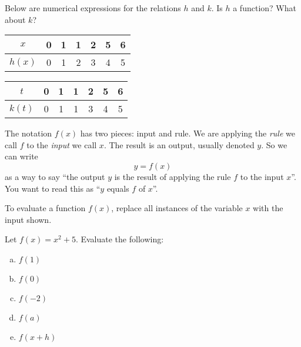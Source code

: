\documentclass[notes]{subfiles}
\begin{document}
		\begin{ex} 
			Below are numerical expressions for the relations $h$ and $k$.  Is $h$ a function?  What about $k$?
			\begin{center}
				{\renewcommand{\arraystretch}{1.2}
				\begin{tabular}{|c|c|c|c|c|c|c|} \hline
					$x$ & 0 & 1 & 1 & 2 & 5 & 6 \\ \hline
					$h(x)$ & 0& 1 & 2 & 3 & 4 & 5 \\ \hline
				\end{tabular}\hspace*{15pt}
				\begin{tabular}{|c|c|c|c|c|c|c|} \hline
						$t$ & 0 & 1 & 1 & 2 & 5 & 6 \\ \hline
						$k(t)$ & 0 & 1 & 1 & 3 & 4 & 5 \\ \hline
					\end{tabular}
				}
				\end{center}
		\end{ex}	
			\vs{1}
			\newpage
		
		\begin{rmk}
			The notation \(f(x)\) has two pieces: input and rule. We are applying the \emph{rule} we call \(f\) to the \emph{input} we call \(x\). The result is an output, usually denoted \(y\). So we can write
			\[y = f(x)\]
			as a way to say ``the output \(y\) is the result of applying the rule \(f\) to the input \(x\)''. You want to read this as ``\(y\) equals \(f\) of \(x\)''.
		\end{rmk}

		\begin{rmk}
			To evaluate a function \(f(x)\), replace all instances of the variable \(x\) with the input shown.
		\end{rmk}

		\begin{ex}
			Let \(f(x) = x^2 + 5\). Evaluate the following:
			\begin{multicols}{2}
				\begin{enumerate}[(a)]
					\item \(f(1)\)
						\vspace*{35pt}

					\item \(f(0)\)
						\vspace*{35pt}

					\item \(f(-2)\)
						\vspace*{35pt}

					\item \(f(a)\)
						\vspace*{35pt}

					\item \(f(x + h)\)
						\vspace*{35pt}
				\end{enumerate}
			\end{multicols}
		\end{ex}
\end{document}
